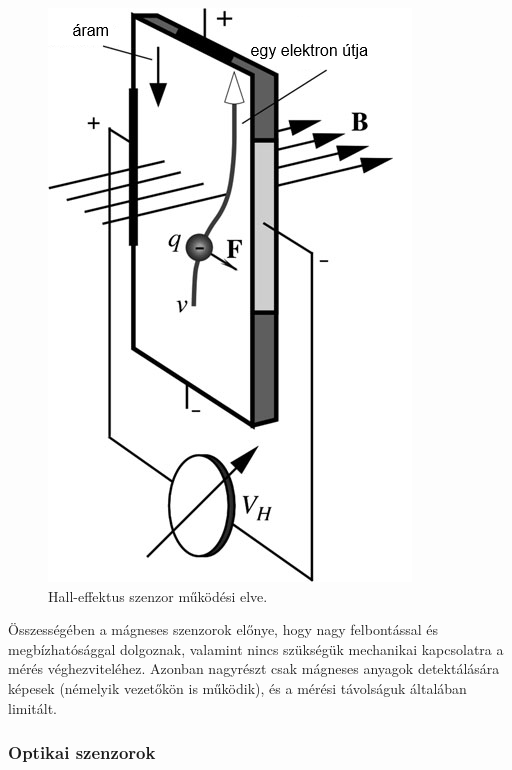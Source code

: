 \begin{itemize}
\begin{figure}
		\includegraphics[width=\columnwidth/4]{figures/hall_effektus.png}
		\caption{Hall-effektus szenzor működési elve.}
		\label{hall_effektus}
	\end{figure}
\end{itemize}
Összességében a mágneses szenzorok előnye, hogy nagy felbontással és megbízhatósággal dolgoznak, valamint nincs szükségük mechanikai kapcsolatra a mérés véghezviteléhez. Azonban nagyrészt csak mágneses anyagok detektálására képesek (némelyik vezetőkön is működik), és a mérési távolságuk általában limitált.

\subsubsection{Optikai szenzorok}



